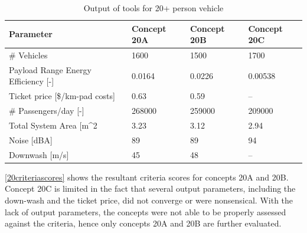
\begin{table}[h]
\centering
\captionsetup{justification=centering}
\caption{Output of tools for 20+ person vehicle}
\label{20output}
\begin{tabular}{@{}llll@{}}
\toprule
\textbf{Parameter}                                          & \textbf{Concept 20A} & \textbf{Concept 20B} & \textbf{Concept 20C} \\ \midrule
\# Vehicles                                                 &      1600             &     1500            &      1700         \\
Payload Range Energy Efficiency    {[}-{]}                      &      0.0164           &       0.0226         &         0.00538         \\
Ticket price {[}\$/km-pad costs{]}                          &   0.63                    &      0.59            &   --           \\
\# Passengers/day {[}-{]}                                   &     268000           &       259000          &      209000     \\
Total System Area {[}m\textasciicircum{}2                   &    3.23             &      3.12           &       2.94      \\
Noise {[}dBA{]}                                             &      89        &      89           &       94       \\ 
Downwash {[}m/s{]}                                          &      45       &     48          &  --  \\ \bottomrule
\end{tabular}
\end{table}

\autoref{20criteriascores} shows the resultant criteria scores for concepts 20A and 20B. Concept 20C is limited in the fact that several output parameters, including the down-wash and the ticket price, did not converge or were nonsensical. With the lack of output parameters, the concepts were not able to be properly assessed against the criteria, hence only concepts 20A and 20B are further evaluated. 

